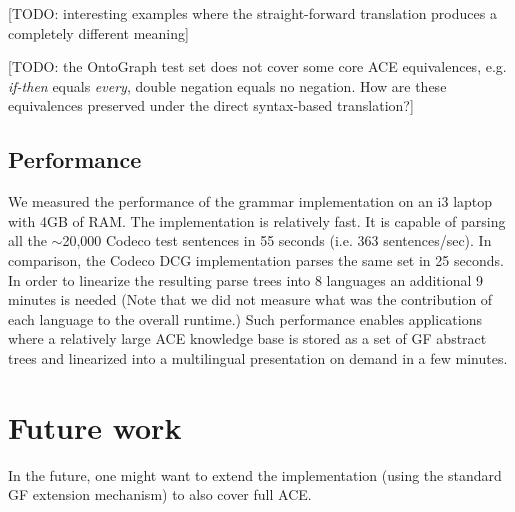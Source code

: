 \documentclass[a4paper]{article}
\begin{document}
[TODO: interesting examples where the straight-forward translation produces
a completely different meaning]

[TODO: the OntoGraph test set does not cover some core ACE equivalences,
e.g. \emph{if-then} equals \emph{every}, double negation equals no negation.
How are these equivalences preserved under the direct syntax-based
translation?]

\subsection{Performance}

We measured the performance of the grammar implementation on an i3 laptop
with 4GB of RAM.
The implementation is relatively fast. It is capable of parsing
all the $\sim$20,000 Codeco test sentences in 55 seconds
(i.e. 363 sentences/sec). In comparison, the Codeco DCG implementation parses
the same set in 25 seconds.
In order to linearize the
resulting parse trees into 8 languages an additional 9 minutes is needed
(Note that we did not measure what was
the contribution of each language to the overall runtime.)
Such performance enables applications where a relatively large ACE knowledge
base is stored as a set of GF abstract trees and linearized into a
multilingual presentation on demand in a few minutes.


\section{Future work}
\label{section:Future_work}

In the
future, one might want to extend the implementation (using
the standard GF extension mechanism) to also cover full ACE.



%
\end{document}
